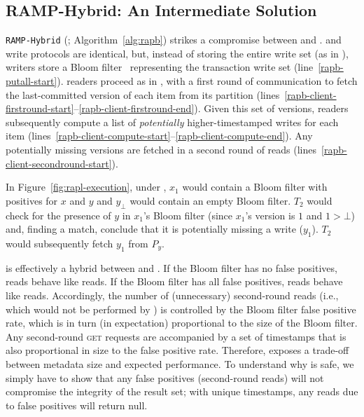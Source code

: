 \subsection{RAMP-Hybrid: An Intermediate Solution}
\label{sec:rapb}

\texttt{RAMP-Hybrid} (\rapb; Algorithm~\ref{alg:rapb}) strikes a
compromise between \rapl and \raps. \rapb and \raps write protocols
are identical, but, instead of storing the entire write set (as in
\rapl), \rapb writers store a Bloom filter~\cite{bloomfilter}
representing the transaction write set
(line~\ref{rapb-putall-start}). \rapb readers proceed as in \rapl, with
a first round of communication to fetch the last-committed version of
each item from its partition
(lines~\ref{rapb-client-firstround-start}--\ref{rapb-client-firstround-end}). Given
this set of versions, \rapb readers subsequently compute a list of
\textit{potentially} higher-timestamped writes for each item
(lines~\ref{rapb-client-compute-start}--\ref{rapb-client-compute-end}). Any
potentially missing versions are fetched in a second round of reads
(lines~\ref{rapb-client-secondround-start}).

 In Figure~\ref{fig:rapl-execution}, under \rapb,
$x_1$ would
contain a Bloom filter with positives for $x$ and $y$ and $y_{\bot}$
would contain an empty Bloom filter. $T_2$ would check for the
presence of $y$ in $x_1$'s Bloom filter (since $x_1$'s version is $1$
and $1 > \bot$) and, finding a match, conclude that it is potentially
missing a write ($y_1$). $T_2$ would subsequently fetch $y_1$ from
$P_y$.

 \rapb is effectively a hybrid between \rapl
and \raps. If the Bloom filter has no false positives, \rapb reads
behave like \rapl reads. If the Bloom filter has all false positives,
\rapb reads behave like \raps reads. Accordingly, the number of
(unnecessary) second-round reads (i.e., which would not be performed
by \rapl) is controlled by the Bloom filter false positive rate, which
is in turn (in expectation) proportional to the size of the Bloom
filter. Any second-round \textsc{get} requests are accompanied by a
set of timestamps that is also proportional in size to the false
positive rate.  Therefore, \rapb exposes a trade-off between metadata
size and expected performance. To understand why \rapb is safe, we
simply have to show that any false positives (second-round reads) will
not compromise the integrity of the result set; with unique
timestamps, any reads due to false positives will return null.


